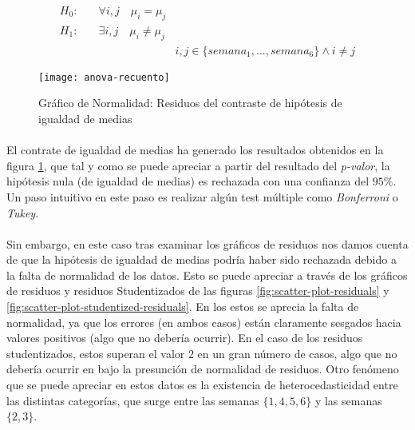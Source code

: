 \documentclass[11pt]{article}
\begin{document}
      \begin{align*}
        H_0:& \quad \forall i,j \quad \mu_{i} = \mu_{j} & \\
        H_1:& \quad \exists i,j \quad \mu_{i} \neq \mu_{j} & \\
        & & i,j \in \{semana_1,...,semana_6\} \land i \neq j
      \end{align*}

      \begin{figure}[!h]
        \centering
        \texttt{[image: anova-recuento]}
        \caption{Gráfico de Normalidad: Residuos del contraste de hipótesis de igualdad de medias}
        \label{img:anova-recuento}
      \end{figure}

      \paragraph{}
      El contrate de igualdad de medias ha generado los resultados obtenidos en la figura \ref{img:anova-recuento}, que tal y como se puede apreciar a partir del resultado del \emph{p-valor}, la hipótesis nula (de igualdad de medias) es rechazada con una confianza del $95\%$. Un paso intuitivo en este paso es realizar algún test múltiple como \emph{Bonferroni} o \emph{Tukey}.

      \paragraph{}
      Sin embargo, en este caso tras examinar los gráficos de residuos nos damos cuenta de que la hipótesis de igualdad de medias podría haber sido rechazada debido a la falta de normalidad de los datos. Esto se puede apreciar a través de los gráficos de residuos y residuos Studentizados de las figuras \ref{fig:scatter-plot-residuals} y \ref{fig:scatter-plot-studentized-residuals}. En los estos se aprecia la falta de normalidad, ya que los errores (en ambos casos) están claramente sesgados hacia valores positivos (algo que no debería ocurrir). En el caso de los residuos studentizados, estos superan el valor $2$ en un gran número de casos, algo que no debería ocurrir en bajo la presunción de normalidad de residuos. Otro fenómeno que se puede apreciar en estos datos es la existencia de heterocedasticidad entre las distintas categorías, que surge entre las semanas $\{ 1, 4, 5, 6\}$ y las semanas $\{ 2, 3\}$.
\end{document}
